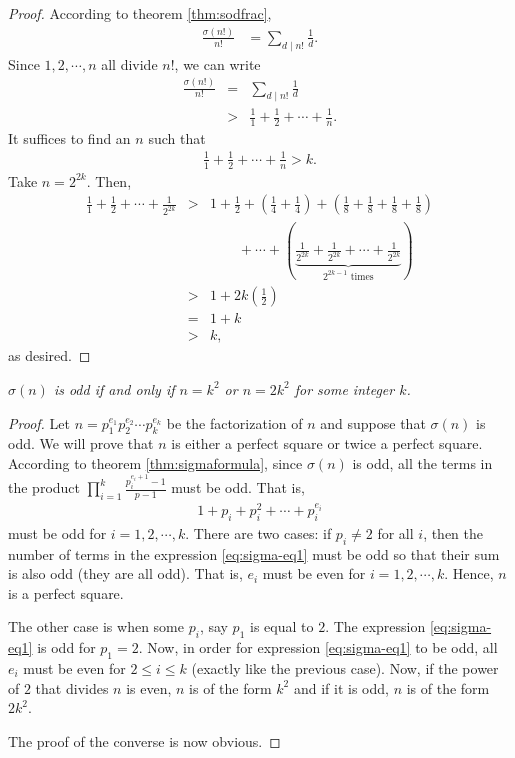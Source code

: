 \documentclass[12pt]{subfile}
\begin{document}
	\begin{proof}
		According to theorem \ref{thm:sodfrac},
			\begin{align*}
				\frac{\sigma(n!)}{n!} &= \sum_{d\mid n!} \frac{1}{d}.
			\end{align*}
		Since $1,2,\cdots,n$ all divide $n!$, we can write
			\begin{eqnarray*}
				\frac{\sigma(n!)}{n!} &=& \sum_{d\mid n!} \frac{1}{d}\\
									  &>& \frac{1}{1} + \frac{1}{2}+ \cdots + \frac{1}{n}.
			\end{eqnarray*}
		It suffices to find an $n$ such that
			\begin{align*}
				\frac{1}{1} + \frac{1}{2}+ \cdots + \frac{1}{n} > k.
			\end{align*}
		Take $n=2^{2k}$. Then,
			\begin{eqnarray*}
				\frac{1}{1} + \frac{1}{2}+ \cdots + \frac{1}{2^{2k}}
					&>& 1 + \frac{1}{2} + \left(\frac{1}{4} + \frac{1}{4}\right) + \left(\frac{1}{8} + \frac{1}{8}+\frac{1}{8} + \frac{1}{8}\right)\\
					&\phantom{>}& \qquad  + \cdots + \left(\underbrace{\frac{1}{2^{2k}}+\frac{1}{2^{2k}}+\cdots+\frac{1}{2^{2k}}}_{2^{2k-1} \text{ times}}\right)\\
					&>& 1+2k\left(\frac{1}{2}\right)\\
					&=& 1+k\\
					&>& k,
			\end{eqnarray*}
		as desired.
	\end{proof}

	\begin{theorem}\slshape\label{thm:oddsigma}
		$\sigma (n)$ is odd if and only if $n=k^2$ or $n=2k^2$ for some integer $k$.
	\end{theorem}

	\begin{proof}
		Let $n=p_1^{e_1}p_2^{e_2}\cdots p_k^{e_k}$ be the factorization of $n$ and suppose that $\sigma(n)$ is odd. We will prove that $n$ is either a perfect square or twice a perfect square. According to theorem \ref{thm:sigmaformula}, since $\sigma(n)$ is odd, all the terms in the product $\prod\limits_{i=1}^{k} \frac{p_i^{e_i+1}-1}{p-1}$ must be odd. That is,
		\begin{align}
			1+p_i+p_i^2+\cdots+p_i^{e_i} \label{eq:sigma-eq1}
		\end{align}
		must be odd for $i=1,2,\cdots,k$. There are two cases: if $p_i\neq 2$ for all $i$, then the number of terms in the expression \ref{eq:sigma-eq1} must be odd so that their sum is also odd (they are all odd). That is, $e_i$ must be even for $i=1,2,\cdots,k$. Hence, $n$ is a perfect square.

		The other case is when some $p_i$, say $p_1$ is equal to $2$. The expression \ref{eq:sigma-eq1} is odd for $p_1=2$. Now, in order for expression \ref{eq:sigma-eq1} to be odd, all $e_i$ must be even for $2 \leq i \leq k$ (exactly like the previous case). Now, if the power of $2$ that divides $n$ is even, $n$ is of the form $k^2$ and if it is odd, $n$ is of the form $2k^2$.

		The proof of the converse is now obvious.
	\end{proof}
\end{document}
